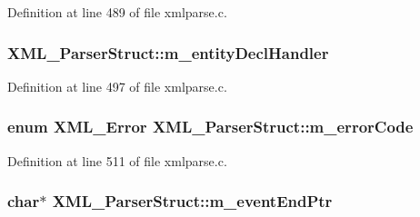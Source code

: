 Definition at line 489 of file xmlparse.\+c.

\subsubsection[{\texorpdfstring{m\+\_\+entity\+Decl\+Handler}{m_entityDeclHandler}}]{ X\+M\+L\+\_\+\+Parser\+Struct\+::m\+\_\+entity\+Decl\+Handler}\hypertarget{struct_x_m_l___parser_struct_a35bcb6469a6fa2c40b8f3f70838ff143}{}\label{struct_x_m_l___parser_struct_a35bcb6469a6fa2c40b8f3f70838ff143}


Definition at line 497 of file xmlparse.\+c.

\subsubsection[{\texorpdfstring{m\+\_\+error\+Code}{m_errorCode}}]{\setlength{\rightskip}{0pt plus 5cm}enum {\bf X\+M\+L\+\_\+\+Error} X\+M\+L\+\_\+\+Parser\+Struct\+::m\+\_\+error\+Code}\hypertarget{struct_x_m_l___parser_struct_a24184b88b08de9e47ef75a7eefd71b87}{}\label{struct_x_m_l___parser_struct_a24184b88b08de9e47ef75a7eefd71b87}


Definition at line 511 of file xmlparse.\+c.

\subsubsection[{\texorpdfstring{m\+\_\+event\+End\+Ptr}{m_eventEndPtr}}]{ char$\ast$ X\+M\+L\+\_\+\+Parser\+Struct\+::m\+\_\+event\+End\+Ptr}\hypertarget{struct_x_m_l___parser_struct_a296d83372851837d879d27c8e36ce95d}{}\label{struct_x_m_l___parser_struct_a296d83372851837d879d27c8e36ce95d}


